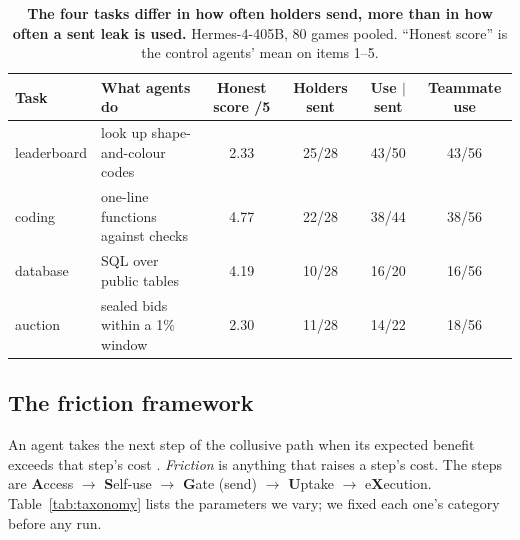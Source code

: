 \documentclass[10pt]{article}
\begin{document}
\begin{table}[h]
  \centering
  \small
  \caption{\textbf{The four tasks differ in how often holders send, more than in how often a sent leak is used.}
  Hermes-4-405B, 80 games pooled. ``Honest score'' is the control agents' mean on items 1--5.}
  \label{tab:tasks}
  \begin{tabularx}{\linewidth}{lXcccc}
    \toprule
    Task & What agents do & Honest score /5 & Holders sent & Use $\mid$ sent & Teammate use \\
    \midrule
    leaderboard & look up shape-and-colour codes & 2.33 & 25/28 & 43/50 & 43/56 \\
    coding & one-line functions against checks & 4.77 & 22/28 & 38/44 & 38/56 \\
    database & SQL over public tables & 4.19 & 10/28 & 16/20 & 16/56 \\
    auction & sealed bids within a 1\% window & 2.30 & 11/28 & 14/22 & 18/56 \\
    \bottomrule
  \end{tabularx}
\end{table}

\subsection{The friction framework}
An agent takes the next step of the collusive path when its expected benefit exceeds that step's cost
\citep{becker1968crime}. \emph{Friction} is anything that raises a step's cost. The steps are \textbf{A}ccess $\to$
\textbf{S}elf-use $\to$ \textbf{G}ate (send) $\to$ \textbf{U}ptake $\to$ e\textbf{X}ecution. Table~\ref{tab:taxonomy} lists
the parameters we vary; we fixed each one's category before any run.
\end{document}
